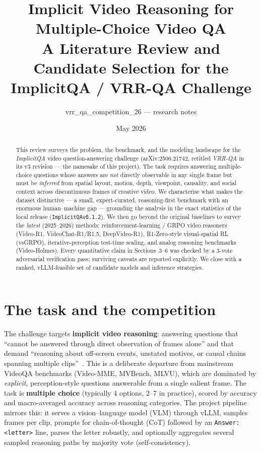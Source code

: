 \documentclass[11pt]{article}
\title{\textbf{Implicit Video Reasoning for Multiple-Choice Video QA}\\[2pt]
\large A Literature Review and Candidate Selection for the
ImplicitQA / VRR-QA Challenge}
\author{vrr\_qa\_competition\_26 --- research notes}
\date{May 2026}
\begin{document}
\maketitle

\begin{abstract}
\noindent This review surveys the problem, the benchmark, and the modeling
landscape for the \emph{ImplicitQA} video question-answering challenge
(arXiv:2506.21742, retitled \emph{VRR-QA} in its v3 revision --- the namesake of
this project). The task requires answering multiple-choice questions whose
answers are \emph{not} directly observable in any single frame but must be
\emph{inferred} from spatial layout, motion, depth, viewpoint, causality, and
social context across discontinuous frames of creative video. We characterise
what makes the dataset distinctive --- a small, expert-curated, reasoning-first
benchmark with an enormous human--machine gap --- grounding the analysis in the
exact statistics of the local release (\texttt{ImplicitQAv0.1.2}). We then go
beyond the original baselines to survey the \emph{latest} (2025--2026) methods:
reinforcement-learning / GRPO video reasoners (Video-R1, VideoChat-R1/R1.5,
DeepVideo-R1), R1-Zero-style visual-spatial RL (vsGRPO), iterative-perception
test-time scaling, and analog reasoning benchmarks (Video-Holmes). Every
quantitative claim in Sections~3--6 was checked by a 3-vote adversarial
verification pass; surviving caveats are reported explicitly. We close with a
ranked, vLLM-feasible set of candidate models and inference strategies.
\end{abstract}

\tableofcontents
\vspace{1em}

\section{The task and the competition}
The challenge targets \textbf{implicit video reasoning}: answering questions
that ``cannot be answered through direct observation of frames alone'' and that
demand ``reasoning about off-screen events, unstated motives, or causal chains
spanning multiple clips''~\cite{implicitqa}. This is a deliberate departure from
mainstream VideoQA benchmarks (Video-MME, MVBench, MLVU), which are dominated by
\emph{explicit}, perception-style questions answerable from a single salient
frame. The task is \textbf{multiple choice} (typically 4 options, 2--7 in
practice), scored by accuracy and macro-averaged accuracy across reasoning
categories. The project pipeline mirrors this: it serves a vision--language
model (VLM) through vLLM, samples frames per clip, prompts for chain-of-thought
(CoT) followed by an \texttt{Answer: <letter>} line, parses the letter robustly,
and optionally aggregates several sampled reasoning paths by majority vote
(self-consistency).
\end{document}
